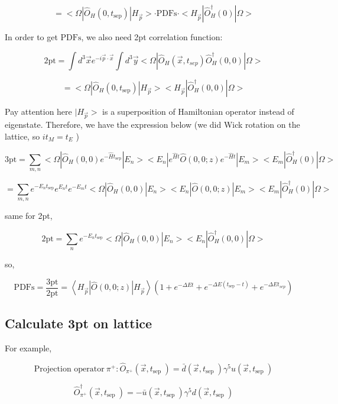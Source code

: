 \documentclass[11pt]{article} %
\begin{document}
\[ = <\Omega |\hat{O}_{H} (0, t_{\text{sep}})  |H_{\vec{p}}> \cdot \text{PDFs} \cdot <H_{\vec{p}}| \hat{O}_{H}^{\dagger}(0) | \Omega> \]

In order to get $\text{PDFs}$, we also need 2pt correlation function:

\[ \text{2pt} = \int d^{3} \vec{x} e^{-i \vec{p} \cdot \vec{x}} \int d^{3} \vec{y}<\Omega |\hat{O}_{H}\left(\vec{x}, t_{s e p}\right) \hat{O}_{H}^{\dagger}(0,0) | \Omega> \]

\[ = <\Omega |\hat{O}_{H} (0, t_{\text{sep}})  |H_{\vec{p}}>  <H_{\vec{p}}| \hat{O}_{H}^{\dagger}(0, 0) | \Omega> \]

{\color{red} Pay attention here $|H_{\vec{p}}>$ is a superposition of Hamiltonian operator instead of eigenstate. Therefore, we have the expression below (we did Wick rotation on the lattice, so $it_{M} = t_{E}$ ) }

\[ \text{3pt} = \sum_{m, n} <\Omega |\hat{O}_{H} (0, 0) e^{- \hat{H} t_{\text{sep}}}  |E_n><E_n| e^{\hat{H} t } \hat{O}(0, 0; z) e^{- \hat{H} t} |E_m><E_m| \hat{O}_{H}^{\dagger}(0) | \Omega>  \]

\[ = \sum_{m, n} e^{- E_n t_{\text{sep}}} e^{E_n t } e^{- E_m t} <\Omega |\hat{O}_{H} (0, 0)  |E_n><E_n|  \hat{O}(0, 0; z) |E_m><E_m| \hat{O}_{H}^{\dagger}(0) | \Omega> \]


same for 2pt,

\[ \text{2pt} =  \sum_{n} e^{- E_n t_{\text{sep}}} <\Omega |\hat{O}_{H} (0, 0)  |E_n>  <E_n| \hat{O}_{H}^{\dagger}(0, 0) | \Omega>  \]

so,

\[ \text{PDFs} = \frac{\text{3pt}}{\text{2pt}} = \left\langle H_{\vec{p}}|\hat{O}(0,0 ; z)| H_{\vec{p}}\right\rangle\left(1+e^{-\Delta E t}+e^{-\Delta E(t_{\text{sep}}-t)}+e^{-\Delta E t_{s e p}}\right) \]


\subsection{Calculate 3pt on lattice}

For example,

\[ \text{Projection operator}\ \pi^+: \hat{O}_{\pi^+}\left(\vec{x}, t_{\text {sep }}\right)=\bar{d}\left(\vec{x}, t_{\text {sep }}\right) \gamma^{5} u\left(\vec{x}, t_{\text {sep }}\right) \]

\[ \hat{O}^{\dagger}_{\pi^+}\left(\vec{x}, t_{\text {sep }}\right)=- \bar{u}\left(\vec{x}, t_{\text {sep }}\right) \gamma^{5} d\left(\vec{x}, t_{\text {sep }}\right) \]
\end{document}
